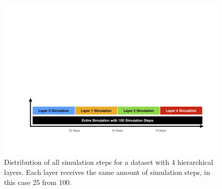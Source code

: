 \begin{figure}[h]
    \centering
    \includegraphics[width=\textwidth, trim={5cm 5cm 0 25cm},clip]{graphics/simulationStepsSplit.jpg}
    \caption[Optional caption for the figure list (often used to abbreviate long captions)]{Distribution of all simulation steps for a dataset with 4 hierarchical layers. Each layer receives the same amount of simulation steps, in this case 25 from 100.} %
    \label{fig:SimulationSteps} 
  \end{figure}

